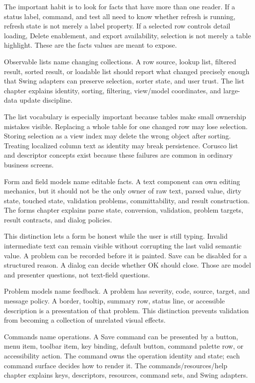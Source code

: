 The important habit is to look for facts that have more than one reader. If a status label, command, and test all need to know whether refresh is running, refresh state is not merely a label property. If a selected row controls detail loading, Delete enablement, and export availability, selection is not merely a table highlight. These are the facts values are meant to expose.

Observable lists name changing collections. A row source, lookup list, filtered result, sorted result, or loadable list should report what changed precisely enough that Swing adapters can preserve selection, sorter state, and user trust. The list chapter explains identity, sorting, filtering, view/model coordinates, and large-data update discipline.

The list vocabulary is especially important because tables make small ownership mistakes visible. Replacing a whole table for one changed row may lose selection. Storing selection as a view index may delete the wrong object after sorting. Treating localized column text as identity may break persistence. Corusco list and descriptor concepts exist because these failures are common in ordinary business screens.

Form and field models name editable facts. A text component can own editing mechanics, but it should not be the only owner of raw text, parsed value, dirty state, touched state, validation problems, committability, and result construction. The forms chapter explains parse state, conversion, validation, problem targets, result contracts, and dialog policies.

This distinction lets a form be honest while the user is still typing. Invalid intermediate text can remain visible without corrupting the last valid semantic value. A problem can be recorded before it is painted. Save can be disabled for a structured reason. A dialog can decide whether OK should close. Those are model and presenter questions, not text-field questions.

Problem models name feedback. A problem has severity, code, source, target, and message policy. A border, tooltip, summary row, status line, or accessible description is a presentation of that problem. This distinction prevents validation from becoming a collection of unrelated visual effects.

Commands name operations. A Save command can be presented by a button, menu item, toolbar item, key binding, default button, command palette row, or accessibility action. The command owns the operation identity and state; each command surface decides how to render it. The commands/resources/help chapter explains keys, descriptors, resources, command sets, and Swing adapters.

